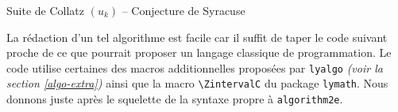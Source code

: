 \documentclass[12pt,a4paper]{article}
\theoremstyle{definition}
\begin{document}
\bigskip


\begin{algo*}
    \caption{Suite de Collatz $(u_k)$ -- Conjecture de Syracuse}


    \addalgoblank    %

\end{algo*}


\bigskip


La rédaction d'un tel algorithme est facile car il suffit de taper le code suivant proche de ce que pourrait proposer un langage classique de programmation. Le code utilise certaines des macros additionnelles proposées par \verb+lyalgo+ \emph{(voir la section \ref{algo-extra})} ainsi que la macro \verb+\ZintervalC+ du package \verb+lymath+. Nous donnons juste après le squelette de la syntaxe propre à \verb+algorithm2e+.
\end{document}
